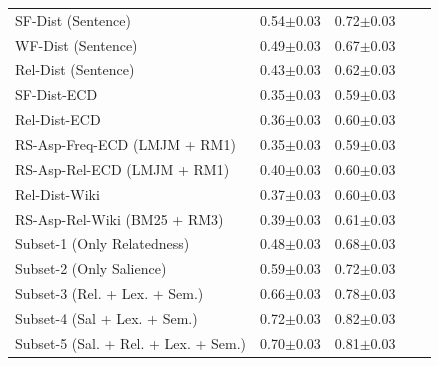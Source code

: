 \begin{table}[t]
\begin{tabular}{@{}lllll@{}}
     
      SF-Dist (Sentence)   &    
      0.54$\pm$0.03 &
      0.72$\pm$0.03
      \\
      
     
      WF-Dist (Sentence)  &    
      0.49$\pm$0.03 &
      0.67$\pm$0.03
      \\
      
      
      Rel-Dist (Sentence)  &    
      0.43$\pm$0.03 &
     0.62$\pm$0.03
      \\
       \midrule
      
    
      SF-Dist-ECD   &    
      0.35$\pm$0.03 &
      0.59$\pm$0.03
      \\
      
      
      Rel-Dist-ECD  &    
      0.36$\pm$0.03 &
      0.60$\pm$0.03
      \\
      
     
      RS-Asp-Freq-ECD (LMJM + RM1)  &     
      0.35$\pm$0.03 &
      0.59$\pm$0.03
      \\
      
       
      RS-Asp-Rel-ECD (LMJM + RM1) &     
      0.40$\pm$0.03 &
      0.60$\pm$0.03
      \\
       \midrule
      
      
      Rel-Dist-Wiki  &    
      0.37$\pm$0.03 &
      0.60$\pm$0.03
      \\
      
      
       
      RS-Asp-Rel-Wiki (BM25 + RM3)  &     
      0.39$\pm$0.03 &
      0.61$\pm$0.03
      \\
      \midrule
      
       Subset-1 (Only Relatedness) &
      0.48$\pm$0.03 &
      0.68$\pm$0.03
      \\
      
      
      Subset-2 (Only Salience) &
      0.59$\pm$0.03 &
      0.72$\pm$0.03
      \\
      
       Subset-3 (Rel. + Lex. + Sem.) &
      0.66$\pm$0.03 &
      0.78$\pm$0.03
      \\
      
       Subset-4 (Sal + Lex. + Sem.) &
      
      0.72$\pm$0.03 &
      0.82$\pm$0.03
      \\
      
      
      Subset-5 (Sal. + Rel. + Lex. + Sem.) &
      0.70$\pm$0.03 &
      0.81$\pm$0.03
      \\
     
      
      

     
      
       \bottomrule
    \end{tabular}
\end{table}

 




  
